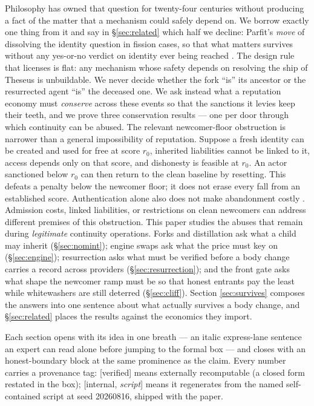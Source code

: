\documentclass[11pt,a4paper]{article}
\begin{document}
Philosophy has owned that question for twenty-four centuries without producing a fact of the matter that a mechanism could safely
depend on. We borrow exactly one thing from it and say in \S\ref{sec:related} which half we decline: Parfit's \emph{move} of
dissolving the identity question in fission cases, so that what matters survives without any yes-or-no verdict on identity ever
being reached \cite{parfit,parfit1971}. The design rule that licenses is flat: any mechanism whose safety depends on resolving the
ship of Theseus is unbuildable. We never decide whether the fork ``is'' its ancestor or the resurrected agent ``is'' the deceased one. We ask instead
what a reputation economy must \emph{conserve} across these events so that the sanctions it levies keep their teeth, and we prove
three conservation results --- one per door through which continuity can be abused. The relevant newcomer-floor obstruction is narrower than a general impossibility of reputation. Suppose a fresh identity can be created and used for free at score $r_0$, inherited liabilities cannot be linked to it, access depends only on that score, and dishonesty is feasible at $r_0$. An actor sanctioned below $r_0$ can then return to the clean baseline by resetting. This defeats a penalty below the newcomer floor; it does not erase every fall from an established score. Authentication alone also does not make abandonment costly \cite{friedman-resnick,douceur}. Admission costs, linked liabilities, or restrictions on clean newcomers can address different premises of this obstruction. This paper studies the abuses that remain during \emph{legitimate} continuity operations. Forks and
distillation ask what a child may inherit (\S\ref{sec:nomint}); engine swaps ask what the price must key on
(\S\ref{sec:engine}); resurrection asks what must be verified before a body change carries a record across providers
(\S\ref{sec:resurrection}); and the front gate asks what shape the newcomer ramp must be so that honest entrants pay the least
while whitewashers are still deterred (\S\ref{sec:cliff}). Section \ref{sec:survives} composes the answers into one sentence about
what actually survives a body change, and \S\ref{sec:related} places the results against the economics they import.

Each section opens with its idea in one breath --- an italic express-lane sentence an expert can read alone before jumping to the
formal box --- and closes with an honest-boundary block at the same prominence as the claim. Every number carries a provenance tag:
[verified] means externally recomputable (a closed form restated in the box); [internal, \emph{script}] means it regenerates from
the named self-contained script at seed 20260816, shipped with the paper.
\end{document}
